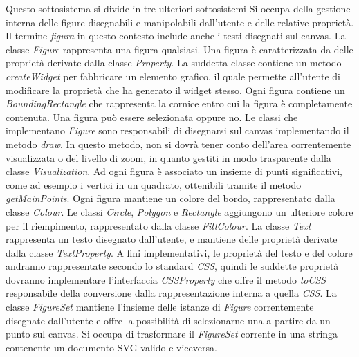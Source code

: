 Questo sottosistema si divide in tre ulteriori sottosistemi
Si occupa della gestione interna delle figure disegnabili e manipolabili dall'utente e delle relative propriet\`a. Il termine \textit{figura} in questo contesto include anche i testi disegnati sul canvas. La classe \textit{Figure} rappresenta una figura qualsiasi. Una figura \`e caratterizzata da delle propriet\`a derivate dalla classe \textit{Property}. La suddetta classe contiene un metodo \textit{createWidget} per fabbricare un elemento grafico, il quale permette all'utente di modificare la propriet\`a che ha generato il widget stesso. Ogni figura contiene un \textit{BoundingRectangle} che rappresenta la cornice entro cui la figura \`e completamente contenuta. Una figura pu\`o essere selezionata oppure no. Le classi che implementano \textit{Figure} sono responsabili di disegnarsi sul canvas implementando il metodo \textit{draw}. In questo metodo, non si dovr\`a tener conto dell'area correntemente visualizzata o del livello di zoom, in quanto gestiti in modo trasparente dalla classe \textit{Visualization}. Ad ogni figura \`e associato un insieme di punti significativi, come ad esempio i vertici in un quadrato, ottenibili tramite il metodo \textit{getMainPoints}. Ogni figura mantiene un colore del bordo, rappresentato dalla classe \textit{Colour}. Le classi \textit{Circle}, \textit{Polygon} e \textit{Rectangle} aggiungono un ulteriore colore per il riempimento, rappresentato dalla classe \textit{FillColour}. La classe \textit{Text} rappresenta un testo disegnato dall'utente, e mantiene delle propriet\`a derivate dalla classe \textit{TextProperty}. A fini implementativi, le propriet\`a del testo e del colore andranno rappresentate secondo lo standard \textit{CSS}, quindi le suddette propriet\`a dovranno implementare l'interfaccia \textit{CSSProperty} che offre il metodo \textit{toCSS} responsabile della conversione dalla rappresentazione interna a quella \textit{CSS}. La classe \textit{FigureSet} mantiene l'insieme delle istanze di \textit{Figure} correntemente disegnate dall'utente e offre la possibilit\`a di selezionarne una a partire da un punto sul canvas.
\newpage
{}
Si occupa di trasformare il \textit{FigureSet} corrente in una stringa 
contenente un documento SVG valido e viceversa. 

